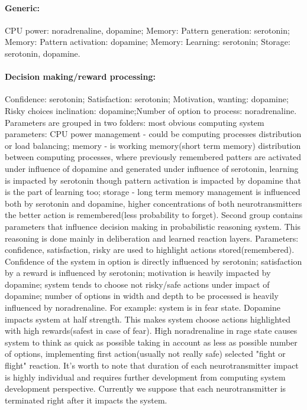 \paragraph{Generic:} 
CPU power: noradrenaline, dopamine; Memory: Pattern generation: serotonin; Memory: Pattern activation: dopamine; Memory: Learning: serotonin; Storage: serotonin, dopamine.
\paragraph{Decision making/reward processing:}
Confidence: serotonin; Satisfaction: serotonin; Motivation, wanting: dopamine; Risky choices inclination: dopamine;Number of option to process: noradrenaline.\\
Parameters are grouped in two folders: most obvious computing system parameters: CPU power management - could be computing processes distribution or load balancing; memory - is working memory(short term memory) distribution between computing processes, where previously remembered patters are activated under influence of dopamine and generated under influence of serotonin, learning is impacted by serotonin though pattern activation is impacted by dopamine that is the part of learning too; storage - long term memory management is influenced both by serotonin and dopamine, higher concentrations of both neurotransmitters the better action is remembered(less probability to forget). Second group contains parameters that influence decision making in probabilistic reasoning system. This reasoning is done mainly in deliberation and learned reaction layers. Parameters: confidence, satisfaction, risky are used to highlight actions stored(remembered). Confidence of the system in option is directly influenced by serotonin; satisfaction by a reward is influenced by serotonin; motivation is heavily impacted by dopamine; system tends to choose not risky/safe actions under impact of dopamine; number of options in width and depth to be processed is heavily influenced by noradrenaline.
For example: system is in fear state. Dopamine impacts system at half strength. This makes system choose actions highlighted with high rewards(safest in case of fear). High noradrenaline in rage state causes system to think as quick as possible taking in account as less as possible number of options, implementing first action(usually not really safe) selected "fight or flight" reaction.
It's worth to note that duration of each neurotransmitter impact is highly individual and requires further development from computing system development perspective. Currently we suppose that each neurotransmitter is terminated right after it impacts the system.

